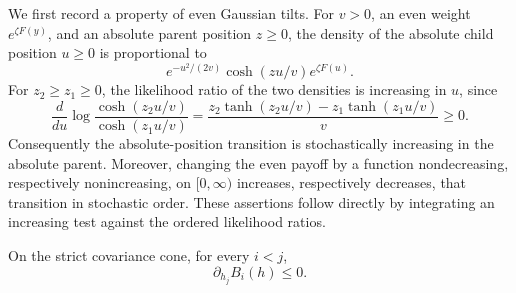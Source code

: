 We first record a property of even Gaussian tilts. For $v>0$, an even
weight $e^{\zeta F(y)}$, and an absolute parent position $z\geq0$,
the density of the absolute child position $u\geq0$ is proportional to
\begin{equation}\label{fld:folded}
 e^{-u^2/(2v)}\cosh(zu/v)e^{\zeta F(u)}.
\end{equation}
For $z_2\geq z_1\geq0$, the likelihood ratio of the two densities is
increasing in $u$, since
\[
 \frac{d}{du}\log\frac{\cosh(z_2u/v)}{\cosh(z_1u/v)}
 =\frac{z_2\tanh(z_2u/v)-z_1\tanh(z_1u/v)}{v}\geq0.
\]
Consequently the absolute-position transition is stochastically
increasing in the absolute parent. Moreover, changing the even payoff
by a function nondecreasing, respectively nonincreasing, on
$[0,\infty)$ increases, respectively decreases, that transition in
stochastic order. These assertions follow directly by integrating an
increasing test against the ordered likelihood ratios.

\begin{lemma}\label{fld:mixed}
On the strict covariance cone, for every $i<j$,
\[
 \partial_{h_j}B_i(h)\leq0.
\]
\end{lemma}

